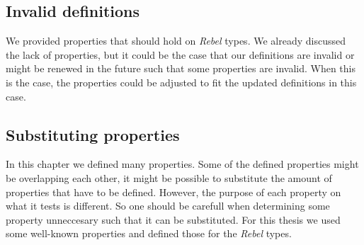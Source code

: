 \subsection*{Invalid definitions}
We provided properties that should hold on \textit{Rebel} types. We already discussed the lack of properties, but it could be the case that our definitions are invalid or might be renewed in the future such that some properties are invalid. When this is the case, the properties could be adjusted to fit the updated definitions in this case.

\subsection*{Substituting properties}
In this chapter we defined many properties. Some of the defined properties might be overlapping each other, it might be possible to substitute the amount of properties that have to be defined. However, the purpose of each property on what it tests is different. So one should be carefull when determining some property unneccesary such that it can be substituted. For this thesis we used some well-known properties and defined those for the \textit{Rebel} types.
